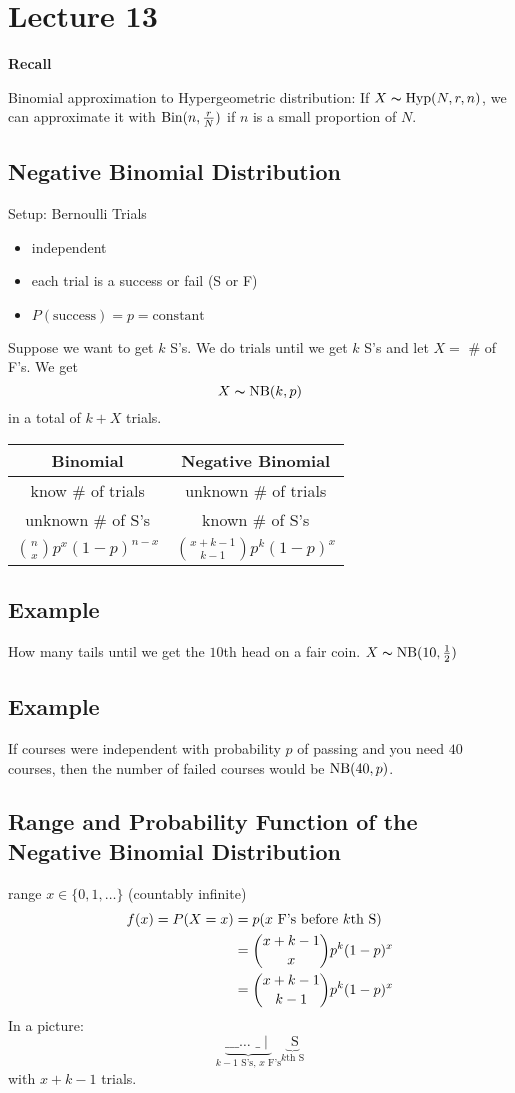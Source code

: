 \section{Lecture 13}
\textbf{Recall}

Binomial approximation to Hypergeometric distribution:
If $ X\thicksim\operatorname{Hyp} (N,r,n) $, we can approximate it with 
$ \operatorname{Bin} (n,\frac{r}{N}) $ if $ n $ is a small proportion of $ N $.

\subsection{Negative Binomial Distribution}
Setup: Bernoulli Trials
\begin{itemize}
    \item independent
    \item each trial is a success or fail (S or F)
    \item $ P(\text{success})=p=\text{constant} $ 
\end{itemize}
Suppose we want to get $ k $ S's. We do trials until we get
$ k $ S's and let $ X= $ \# of F's. We get
\[ X\thicksim \operatorname{NB}(k,p) \]
in a total of $ k+X $ trials.

\begin{tabular}{|c|c|}
    Binomial & Negative Binomial \\
    \hline
    know \# of trials & unknown \# of trials\\
    unknown \# of S's & known \# of S's\\
    $ \binom{n}{x}p^x(1-p)^{n-x} $ & 
    $ \binom{x+k-1}{k-1}p^k(1-p)^x $ 
\end{tabular}

\subsection{Example}
How many tails until we get the $10$th head on a fair coin.
$ X\thicksim\operatorname{NB}(10,\frac{1}{2}) $

\subsection{Example}
If courses were independent with probability $ p $ of passing
and you need $ 40 $ courses, then the number of failed courses
would be $ \operatorname{NB}(40,p) $.

\subsection{Range and Probability Function of the Negative Binomial Distribution}
range $ x\in\{0,1,\dots\} $ (countably infinite)
\begin{align*}
    f(x)=P(X=x)
    &=p(x\text{ F's before $ k $th S})\\
    &=\binom{x+k-1}{x}p^k(1-p)^x\\
    &=\binom{x+k-1}{k-1}p^k(1-p)^x
\end{align*}
In a picture:
\[\underbrace{\text{\_ \_ \_ $\ldots$ \_}\mid}_
{k-1 \text{ S's, }x \text{ F's}}
\underbrace{\text{ S}}_{k\text{th S}}\]
with $ x+k-1 $ trials.

